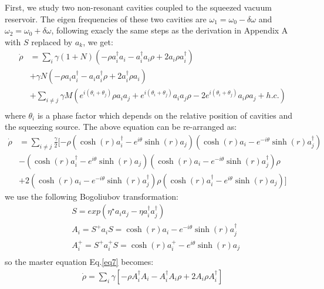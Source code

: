 \documentclass{article}
\begin{document}
First, we study two non-resonant cavities coupled to the squeezed vacuum reservoir. The eigen frequencies of these two cavities are $\omega_1=\omega_0-\delta \omega$ and $\omega_2=\omega_0+\delta \omega$, following exacly the same steps as the derivation in Appendix A with $S$ replaced by $a_k$, we get:
\begin{equation}
\label{eq6}
\begin{split}
\dot{\rho}&=\sum_{i}\gamma(1+N)(-\rho a_{i}^{\dagger}a_{i}-a_{i}^{\dagger}a_{i}\rho+2a_{i}\rho a_{i}^{\dagger})\\
&+\gamma N(-\rho a_{i}a_{i}^{\dagger}-a_{i}a_{i}^{\dagger}\rho+2a_{i}^{\dagger}\rho a_{i})\\
&+\sum_{i\ne j}\gamma M(e^{i(\theta_i+\theta_j)}\rho a_{i}a_{j}+e^{i(\theta_i+\theta_j)}a_{i}a_{j}\rho-2e^{i(\theta_i+\theta_j)}a_{i}\rho a_{j}+h.c.)\\
\end{split}
\end{equation}
where $\theta_i$ is a phase factor which depends on the relative position of cavities and the squeezing source. The above equation can be re-arranged as:
\begin{equation}
\label{eq7}
\begin{split}
\dot{\rho}&=\sum_{i\ne j}\frac{\gamma}{2}[-\rho(\cosh(r)a_{i}^{\dagger}-e^{i\theta}\sinh(r)a_{j})(\cosh(r)a_{i}-e^{-i\theta}\sinh(r)a_{j}^{\dagger})\\
&-(\cosh(r)a_{i}^{\dagger}-e^{i\theta}\sinh(r)a_{j})(\cosh(r)a_{i}-e^{-i\theta}\sinh(r)a_{j}^{\dagger})\rho\\
&+2(\cosh(r)a_{i}-e^{-i\theta}\sinh(r)a_{j}^{\dagger})\rho(\cosh(r)a_{i}^{\dagger}-e^{i\theta}\sinh(r)a_{j})]
\end{split}
\end{equation}
we use the following Bogoliubov transformation\cite{Bogoliubov}:
\begin{equation}
\label{eq8}
\begin{split}
&S=exp(\eta^{\star}a_{i}a_{j}-\eta a_{i}^{\dagger}a_{j}^{\dagger})\\
&A_{i}=S^{+}a_{i}S=\cosh(r)a_{i}-e^{-i\theta}\sinh(r)a_{j}^{\dagger} \\
&A_{i}^{+}=S^{+}a_{i}^{+}S=\cosh(r)a_{i}^{+}-e^{i\theta}\sinh(r)a_{j}\\
\end{split}
\end{equation}
so the master equation Eq.\eqref{eq7} becomes:
\begin{equation}
\label{eq9}
\begin{split}
\dot{\rho}=\sum_{i}\gamma[-\rho A_{i}^{\dagger}A_{i}-A_{i}^{\dagger}A_{i}\rho+2A_{i}\rho A_{i}^{\dagger}]
\end{split}
\end{equation}
\end{document}
